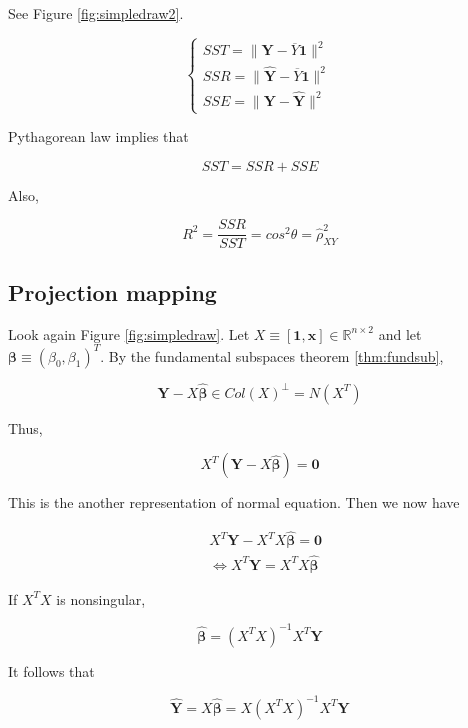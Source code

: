 \documentclass[]{book}
\theoremstyle{definition}
\theoremstyle{definition}
\theoremstyle{definition}
\theoremstyle{remark}
\begin{document}
See Figure \ref{fig:simpledraw2}.

\[
\begin{cases}
  SST = \lVert \mathbf{Y} - \overline{Y} \mathbf{1} \rVert^2 \\
  SSR = \lVert \mathbf{\hat{Y}} - \overline{Y} \mathbf{1} \rVert^2 \\
  SSE = \lVert \mathbf{Y} - \mathbf{\hat{Y}} \rVert^2
\end{cases}
\]

Pythagorean law implies that

\[SST = SSR + SSE\]

Also,

\begin{equation}
  R^2 = \frac{SSR}{SST} = cos^2\theta = \hat\rho_{XY}^2
  \label{eq:rsqcos}
\end{equation}

\hypertarget{solproj}{%
\subsection{Projection mapping}\label{solproj}}

Look again Figure \ref{fig:simpledraw}. Let \(X \equiv [\mathbf{1}, \mathbf{x}] \in \mathbb{R}^{n \times 2}\) and let \(\boldsymbol\beta \equiv (\beta_0, \beta_1)^T\). By the fundamental subspaces theorem \ref{thm:fundsub},

\[\mathbf{Y} - X\boldsymbol{\hat\beta} \in Col(X)^{\perp} = N(X^T)\]

Thus,

\begin{equation}
  X^T(\mathbf{Y} - X\boldsymbol{\hat\beta}) = \mathbf{0}
  \label{eq:projeq}
\end{equation}

This is the another representation of normal equation. Then we now have

\begin{equation*}
  \begin{split}
    & X^T\mathbf{Y} - X^TX\boldsymbol{\hat\beta} = \mathbf{0} \\
    & \Leftrightarrow X^T\mathbf{Y} = X^TX\boldsymbol{\hat\beta}
  \end{split}
\end{equation*}

If \(X^TX\) is nonsingular,

\[\boldsymbol{\hat\beta} = (X^TX)^{-1}X^T \mathbf{Y}\]

It follows that

\[\mathbf{\hat{Y}} = X\boldsymbol{\hat\beta} = X(X^TX)^{-1}X^T \mathbf{Y}\]
\end{document}
